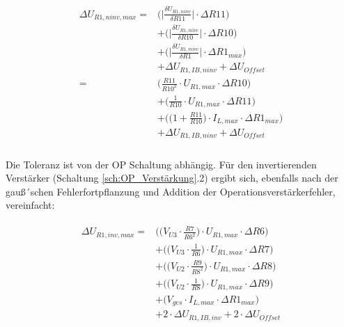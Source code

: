 \begin{multline}
	\label{eq:ninv_Delta_V*U_R1}
	\begin{split}
		\Delta U_{R1,ninv,max} 
						=&  \biggl( \biggl| \frac{\delta U_{R1,ninv}}{\delta R11} \biggr| \cdot \Delta R11 \biggr) \\ &+
							\biggl( \biggl| \frac{\delta U_{R1,ninv}}{\delta R10} \biggr| \cdot \Delta R10 \biggr) \\ &+ 
						 	\biggl( \biggl| \frac{\delta U_{R1,ninv}}{\delta R1}  \biggr| \cdot \Delta R1_{max} \biggr) \\ &+
							\Delta U_{R1,IB,ninv} + \Delta U_{Offset}\\
						=&  
							\biggl( \frac{R11}{R10^2} \cdot U_{R1,max} \cdot \Delta R10 \biggr) \\ &+ 
							\biggl( \frac{1}{R10} \cdot U_{R1,max} \cdot \Delta R11 \biggr) \\ &+
							\biggl( \biggl( 1 +\frac{R11}{R10}\biggr)\cdot I_{L,max} \cdot \Delta R1_{max} \biggr) \\ &+
							\Delta U_{R1,IB,ninv} + \Delta U_{Offset}\\
	\end{split}
\end{multline}


Die Toleranz ist von der OP Schaltung abhängig. Für den invertierenden Verstärker (Schaltung \ref{sch:OP_Verstärkung}.2) 
ergibt sich, ebenfalls nach der gauß´schen Fehlerfortpflanzung und Addition der Operationsverstärkerfehler, vereinfacht:

\begin{multline}
	\label{eq:inv_Delta_V*U_R1}
	\begin{split}
		\Delta U_{R1,inv,max} 
						=&  \biggl( \biggl(V_{U3} \cdot \frac{R7}{R6^2} \biggr) \cdot U_{R1,max} \cdot \Delta R6 \biggr) \\ &+
							\biggl( \biggl(V_{U3} \cdot \frac{1}{R6} \biggr) \cdot U_{R1,max} \cdot \Delta R7 \biggr) \\ &+ 
							\biggl( \biggl(V_{U2} \cdot \frac{R9}{R8^2} \biggr) \cdot U_{R1,max} \cdot \Delta R8 \biggr) \\ &+
							\biggl( \biggl(V_{U2} \cdot \frac{1}{R8} \biggr) \cdot U_{R1,max} \cdot \Delta R9 \biggr) \\ &+
							\biggl(V_{ges} \cdot I_{L,max} \cdot \Delta R1_{max} \biggr) \\ &+									%
							2 \cdot \Delta U_{R1,IB,inv} + 																		%
							2 \cdot \Delta U_{Offset}\\
	\end{split}
\end{multline}


